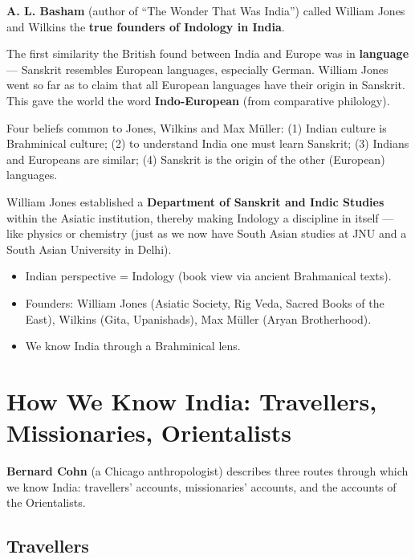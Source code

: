 \begin{DataFact}
\textbf{A. L. Basham} (author of ``The Wonder That Was India'') called William Jones and Wilkins the \textbf{true founders of Indology in India}.
\end{DataFact}

The first similarity the British found between India and Europe was in \textbf{language} --- Sanskrit resembles European languages, especially German. William Jones went so far as to claim that all European languages have their origin in Sanskrit. This gave the world the word \textbf{Indo-European} (from comparative philology).

\begin{KeyConcept}
Four beliefs common to Jones, Wilkins and Max M\"uller: (1) Indian culture is Brahminical culture; (2) to understand India one must learn Sanskrit; (3) Indians and Europeans are similar; (4) Sanskrit is the origin of the other (European) languages.
\end{KeyConcept}

William Jones established a \textbf{Department of Sanskrit and Indic Studies} within the Asiatic institution, thereby making Indology a discipline in itself --- like physics or chemistry (just as we now have South Asian studies at JNU and a South Asian University in Delhi).

\begin{QuickRevision}
\begin{itemize}
\item Indian perspective = Indology (book view via ancient Brahmanical texts).
\item Founders: William Jones (Asiatic Society, Rig Veda, Sacred Books of the East), Wilkins (Gita, Upanishads), Max M\"uller (Aryan Brotherhood).
\item We know India through a Brahminical lens.
\end{itemize}
\end{QuickRevision}

\section{How We Know India: Travellers, Missionaries, Orientalists}

\textbf{Bernard Cohn} (a Chicago anthropologist) describes three routes through which we know India: travellers' accounts, missionaries' accounts, and the accounts of the Orientalists.

\subsection{Travellers}

